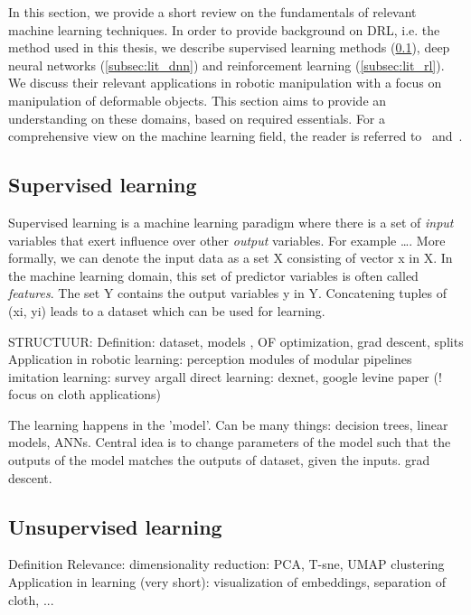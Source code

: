 \documentclass[\home/main.tex]{subfiles}
\begin{document}
In this section, we provide a short review on the fundamentals of relevant machine learning techniques. In order to provide background on \acrfull{DRL}, i.e. the method used in this thesis, we describe supervised learning methods (\cref{subsec:lit_sl}), deep neural networks (\cref{subsec:lit_dnn}) and reinforcement learning (\cref{subsec:lit_rl}). We discuss their relevant applications in robotic manipulation with a focus on manipulation of deformable objects. This section aims to provide an understanding on these domains, based on required essentials. For a comprehensive view on the machine learning field, the reader is referred to~\autocite{Friedman2001} and~\autocite{Bishop2006}.

\subsection{Supervised learning} \label{subsec:lit_sl}


Supervised learning is a machine learning paradigm where there is a set of \textit{input} variables that exert influence over other \textit{output} variables. For example \dots. More formally, we can denote the input data as a set X consisting of vector x in X. In the machine learning domain, this set of predictor variables is often called \textit{features}. The set Y contains the output variables y in Y. Concatening tuples of (xi, yi) leads to a dataset which can be used for learning. 

STRUCTUUR:
	Definition: dataset, models , OF optimization, grad descent, splits 
	Application in robotic learning:
		perception modules of modular pipelines
		imitation learning: survey argall 
		direct learning: dexnet, google levine paper 
		(! focus on cloth applications)


The learning happens in the 'model'. Can be many things: decision trees, linear models, ANNs. 
Central idea is to change parameters of the model such that the outputs of the model matches the outputs of dataset, given the inputs. 
grad descent. 


\subsection{Unsupervised learning}
Definition
Relevance:
	 dimensionality reduction: PCA, T-sne, UMAP 
	 clustering 
Application in learning (very short): visualization of embeddings, separation of cloth, ... 
\end{document}
